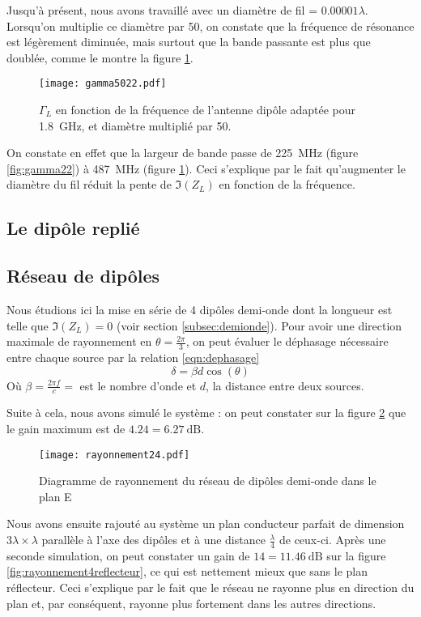 Jusqu'à présent, nous avons travaillé avec un diamètre de fil = $0.00001 \lambda$. Lorsqu'on multiplie ce diamètre par 50, on constate que la fréquence de résonance est légèrement diminuée, mais surtout que la bande passante est plus que doublée, comme le montre la figure \ref{fig:gamma5022}.
\begin{figure}[htbp]
  \centering
  \texttt{[image: gamma5022.pdf]}
  \caption{$\Gamma_L$  en fonction de la fréquence de l'antenne dipôle adaptée pour \SI{1.8}{\giga\hertz}, et diamètre multiplié par 50.\label{fig:gamma5022}}
\end{figure}
On constate en effet que la largeur de bande passe de \SI{225}{\mega\hertz} (figure \ref{fig:gamma22}) à \SI{487}{\mega\hertz} (figure \ref{fig:gamma5022}). Ceci s'explique par le fait qu'augmenter le diamètre du fil réduit la pente de $\Im(Z_L)$ en fonction de la fréquence.

\subsection{Le dipôle replié}



\subsection{Réseau de dipôles}
Nous étudions ici la mise en série de 4 dipôles demi-onde dont la longueur est telle que $\Im(Z_L)=0$ (voir section \ref{subsec:demionde}). Pour avoir une direction maximale de rayonnement en $\theta=\frac{2\pi}{3}$, on peut évaluer le déphasage nécessaire entre chaque source par la relation \ref{eqn:dephasage}
\begin{equation}\label{eqn:dephasage}
\delta = \beta d \cos(\theta)
\end{equation}
Où $\beta = \frac{2\pi f}{c} = $ est le nombre d'onde et $d$, la distance entre deux sources.

Suite à cela, nous avons simulé le système : on peut constater sur la figure \ref{fig:rayonnement4} que le gain maximum est de $\num{4.24} = \SI{6.27}{\deci\bel}$.

\begin{figure}[htbp]
  \centering
  \texttt{[image: rayonnement24.pdf]}
  \caption{Diagramme de rayonnement du réseau de dipôles demi-onde dans le plan E\label{fig:rayonnement4}}
\end{figure}

Nous avons ensuite rajouté au système un plan conducteur parfait de dimension $3\lambda \times \lambda$ parallèle à l'axe des dipôles et à une distance $\frac{\lambda}{4}$ de ceux-ci. Après une seconde simulation, on peut constater un gain de $\num{14} = \SI{11.46}{\deci\bel}$ sur la figure \ref{fig:rayonnement4reflecteur}, ce qui est nettement mieux que sans le plan réflecteur. Ceci s'explique par le fait que le réseau ne rayonne plus en direction du plan et, par conséquent, rayonne plus fortement dans les autres directions.

